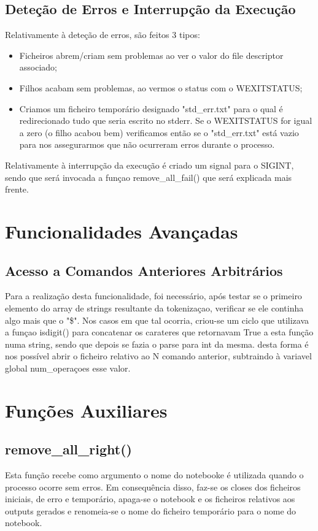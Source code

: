 \documentclass{report}
\begin{document}
\subsection{Deteção de Erros e Interrupção da Execução}
Relativamente à deteção de erros, são feitos 3 tipos:
\begin{itemize}
    \item Ficheiros abrem/criam sem problemas ao ver o valor do file descriptor associado;
    \item Filhos acabam sem problemas, ao vermos o status com o WEXITSTATUS;
    \item Criamos um ficheiro temporário designado "std\_err.txt" para o qual é redirecionado tudo que seria escrito no stderr. Se o WEXITSTATUS for igual a zero (o filho acabou bem) verificamos então se o "std\_err.txt" está vazio para nos assegurarmos que não ocurreram erros durante o processo.
\end{itemize}
Relativamente à interrupção da execução é criado um signal para o SIGINT, sendo que será invocada a funçao remove\_all\_fail() que será explicada mais frente. 
\newpage
\section{Funcionalidades Avançadas}
\subsection{Acesso a Comandos Anteriores Arbitrários}
Para a realização desta funcionalidade, foi necessário, após testar se o primeiro elemento do array de strings resultante da tokenizaçao, verificar se ele continha algo mais que o "\$". Nos casos em que tal ocorria, criou-se um ciclo que utilizava a funçao isdigit() para concatenar os carateres que retornavam True a esta função numa string, sendo que depois se fazia o parse para int da mesma. desta forma é nos possível abrir o ficheiro relativo ao N comando anterior, subtraindo à variavel global num\_operaçoes esse valor.

\section{Funções Auxiliares}
\subsection{remove\_all\_right()}
Esta função recebe como argumento o nome do notebooke  é utilizada quando o processo ocorre sem erros. Em consequência disso, faz-se os closes dos ficheiros iniciais, de erro e temporário, apaga-se o notebook e os ficheiros relativos aos outputs gerados e renomeia-se o nome do ficheiro temporário para o nome do notebook.
\end{document}
